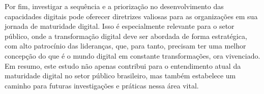 Por fim, investigar a sequência e a priorização no desenvolvimento das capacidades digitais pode oferecer diretrizes valiosas para as organizações em sua jornada de maturidade digital. Isso é especialmente relevante para o setor público, onde a transformação digital deve ser abordada de forma estratégica, com alto patrocínio das lideranças, que, para tanto, precisam ter uma melhor concepção do que é o mundo digital em constante transformações, ora vivenciado. Em resumo, este estudo não apenas contribui para o entendimento atual da maturidade digital no setor público brasileiro, mas também estabelece um caminho para futuras investigações e práticas nessa área vital.